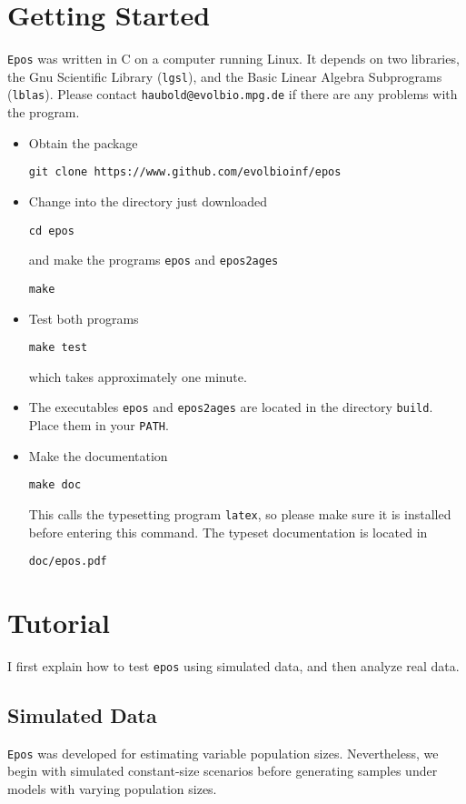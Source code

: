 \documentclass[a4paper, english]{article}
\newcommand{\bi}{\begin{itemize}}
\newcommand{\ei}{\end{itemize}}
\newcommand{\I}{\item}
\newcommand{\ty}{\texttt}
\begin{document}
\section{Getting Started}
\ty{Epos} was written in C on a computer running Linux. It depends on
two libraries, the Gnu Scientific Library
(\ty{lgsl}), and the Basic Linear Algebra Subprograms (\ty{lblas}). 
Please contact \ty{haubold@evolbio.mpg.de} if there are any problems with the program.
\bi
\I Obtain the package
\begin{verbatim}
git clone https://www.github.com/evolbioinf/epos
\end{verbatim}
\I Change into the directory just downloaded
\begin{verbatim}
cd epos
\end{verbatim}
and make the programs \ty{epos} and \ty{epos2ages}
\begin{verbatim}
make
\end{verbatim}
\I Test both programs
\begin{verbatim}
make test
\end{verbatim}
which takes approximately one minute.
\I The executables \ty{epos} and \ty{epos2ages} are located in the
directory \ty{build}. Place them in your \ty{PATH}.
\I  Make the documentation
\begin{verbatim}
make doc
\end{verbatim}
This calls the typesetting program \ty{latex}, so please make sure it
is installed before entering this command. The typeset documentation is located
in
\begin{verbatim}
doc/epos.pdf
\end{verbatim}
\ei

\section{Tutorial}\label{sec:tut}
I first explain how to test \ty{epos} using simulated data, and then
analyze real data.
\subsection{Simulated Data}
\ty{Epos} was developed for estimating variable population
sizes. Nevertheless, we begin with simulated constant-size
scenarios before generating samples under models with varying population
sizes.
\end{document}
